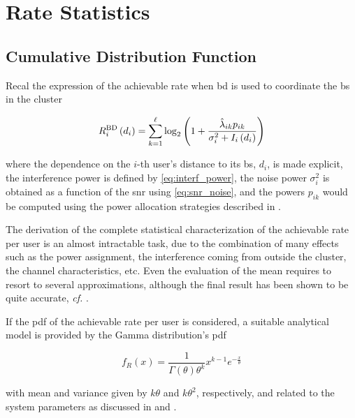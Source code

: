 \section{Rate Statistics}\label{sec:stats_rate_stats}
\subsection{Cumulative Distribution Function}\label{ssec:stats_cdf}

Recal the expression of the achievable rate when \gls{bd} is used to coordinate
the \gls{bs} in the cluster

\begin{equation} \label{eq:stats_achiev_rate}
    R_i^{\text{BD}}\left(d_i\right) = \sum\limits_{k = 1}^{\ell} \log_2 \left(
    1 + \frac{\hat{\lambda}_{ik} p_{ik}}{\sigma_i^2 + I_i\left(d_i\right)} \right)
\end{equation}

\noindent
where the dependence on the $i$-th user's distance to its \gls{bs}, $d_i$, is
made explicit, the interference power is defined by \eqref{eq:interf_power}, the
noise power $\sigma_i^2$ is obtained as a function of the \gls{snr} using
\eqref{eq:snr_noise}, and the powers $p_{ik}$ would be computed using the power
allocation strategies described in .

The derivation of the complete statistical characterization of the achievable
rate per user is an almost intractable task, due to the combination of many
effects such as the power assignment, the interference coming from outside the
cluster, the channel characteristics, etc. Even the evaluation of the mean
requires to resort to several approximations, although the final result has been
shown to be quite accurate, \emph{cf.} .

If the \gls{pdf} of the achievable rate per user is considered, a suitable
analytical model is provided by the Gamma distribution's \gls{pdf}

\begin{equation} \label{eq:gamma_pdf}
   f_{R}\left(x\right) = \frac{1}{\Gamma\left(\theta\right)\theta^k}x^{k-1}
   e^{-\frac{x}{\theta}}
\end{equation}

\noindent
with mean and variance given by $k\theta$ and $k\theta^2$, respectively, and
related to the system parameters as discussed in  and
.

